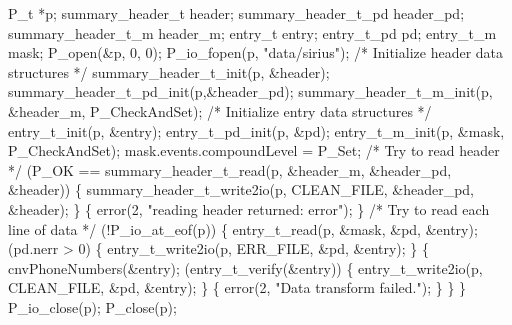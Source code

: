 \begin{centercode}
P\_t                  *p;
summary\_header\_t     header;
summary\_header\_t\_pd  header\_pd;
summary\_header\_t\_m   header\_m;
entry\_t              entry;
entry\_t\_pd           pd;
entry\_t\_m            mask;
\mbox{}
P\_open(&p, 0, 0);
P\_io\_fopen(p, "data/sirius");
\mbox{}
/* Initialize header data structures */
summary\_header\_t\_init(p,   &header);
summary\_header\_t\_pd\_init(p,&header\_pd);
summary\_header\_t\_m\_init(p, &header\_m, P\_CheckAndSet);
\mbox{}
/* Initialize entry data structures */
entry\_t\_init(p,    &entry);
entry\_t\_pd\_init(p, &pd);
entry\_t\_m\_init(p,  &mask, P\_CheckAndSet);
mask.events.compoundLevel = P\_Set;
\mbox{}
/* Try to read header   */
 (P\_OK == summary\_header\_t\_read(p, &header\_m, &header\_pd, &header)) \{
  summary\_header\_t\_write2io(p, CLEAN\_FILE, &header\_pd, &header);
\}  \{
  error(2, "reading header returned: error");
\}
\mbox{}
/* Try to read each line of data  */
 (!P\_io\_at\_eof(p)) \{
  entry\_t\_read(p, &mask, &pd, &entry);
   (pd.nerr > 0) \{
    entry\_t\_write2io(p, ERR\_FILE, &pd, &entry);
  \}  \{
    cnvPhoneNumbers(&entry);
     (entry\_t\_verify(&entry)) \{
      entry\_t\_write2io(p, CLEAN\_FILE, &pd, &entry);
    \}  \{
      error(2, "Data transform failed.");
    \}
  \}
\}
P\_io\_close(p);
P\_close(p);
\end{centercode}
